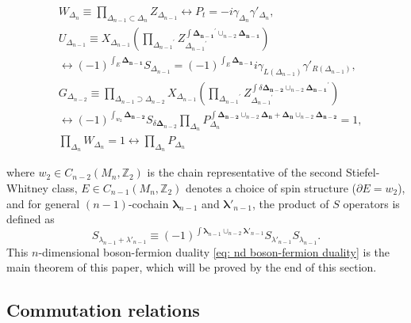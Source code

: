 \documentclass[12pt]{article}
\newcommand{\ZZ}{{\mathbb Z}}
\begin{document}
\hspace*{-2cm}\vbox{
\begin{equation}
\begin{split}
& W_{\Delta_n} \equiv \prod_{\Delta_{n-1} \subset \Delta_n} Z_{\Delta_{n-1}}
\longleftrightarrow P_t = -i\gamma_{\Delta_n}\gamma'_{\Delta_n}, \\[10pt]
&{U}_{\Delta_{n-1}} \equiv X_{\Delta_{n-1}}  \left(\prod_{{\Delta_{n-1}}^\prime}  Z_{{\Delta_{n-1}}^\prime}^{\int \boldsymbol {\Delta_{n-1}}^\prime \cup_{n-2} \boldsymbol {\Delta_{n-1}}}\right)  \\
& \longleftrightarrow (-1)^{\int_E \boldsymbol {\Delta_{n-1}}} S_{\Delta_{n-1}} =     (-1)^{\int_E \boldsymbol {\Delta_{n-1}}} i\gamma_{L({\Delta_{n-1}})}\gamma'_{R({\Delta_{n-1}})},\\[10pt]
&G_{\Delta_{n-2}} \equiv \prod_{{\Delta_{n-1}} \supset {\Delta_{n-2}}} X_{\Delta_{n-1}} \left(\prod_{{\Delta_{n-1}}^\prime} Z_{{\Delta_{n-1}}^\prime}^{\int \delta \boldsymbol {\Delta_{n-2}} \cup_{n-2} \boldsymbol {\Delta_{n-1}}^\prime}\right) \\
&\longleftrightarrow (-1)^{\int_{w_2} \boldsymbol {\Delta_{n-2}}}   S_{\delta \boldsymbol \Delta_{n-2}} \prod_{{\Delta_{n}}} P_{\Delta_{n}}^{\int \boldsymbol {\Delta_{n-2}} \cup_{n-2} \boldsymbol {\Delta_{n}} + \boldsymbol {\Delta_{n}} \cup_{n-2} \boldsymbol {\Delta_{n-2}}} = 1, \\[10pt]
&\prod_{\Delta_{n}} W_{\Delta_{n}} = 1 \longleftrightarrow \prod_{\Delta_{n}} P_{\Delta_{n}}
\end{split}
\label{eq: nd boson-fermion duality}
\end{equation}}

\noindent where $w_2 \in C_{n-2}(M_n,\ZZ_2)$ is the chain representative of the second Stiefel-Whitney class, $E \in C_{n-1}(M_n,\ZZ_2)$ denotes a choice of spin structure ($\partial E = w_2$), and for general $(n-1)$-cochain $\boldsymbol \lambda_{n-1}$ and $ \boldsymbol \lambda'_{n-1}$, the product of $S$ operators is defined as
\begin{equation}
    S_{ \lambda_{n-1} + \lambda'_{n-1}} \equiv (-1)^{\int \boldsymbol \lambda_{n-1} \cup_{n-2} \boldsymbol \lambda'_{n-1}} S_{\lambda'_{n-1}} S_{\lambda_{n-1}}.
\label{eq: S lambda}
\end{equation}
This $n$-dimensional boson-fermion duality \eqref{eq: nd boson-fermion duality} is the main theorem of this paper, which will be proved by the end of this section.

\subsection{Commutation relations} \label{sec: commutation relations}
 
\end{document}
